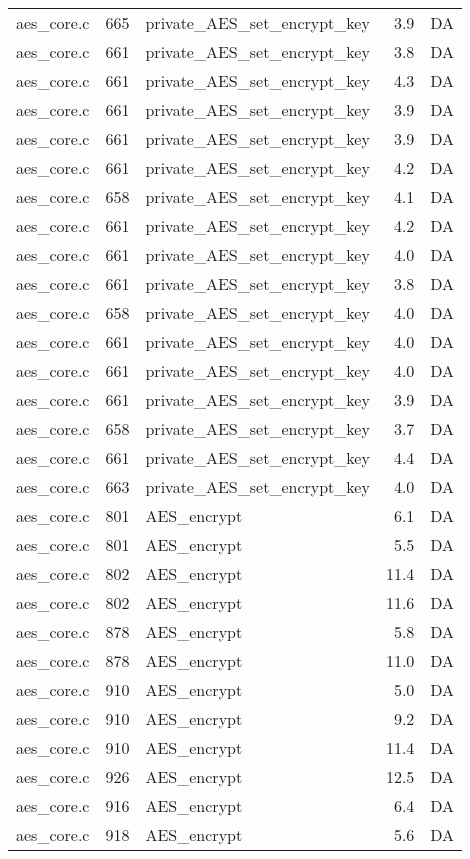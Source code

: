 \begin{table}[!ht]
\begin{tabular}{lrlrr}
aes\_core.c& 665&private\_AES\_set\_encrypt\_key&3.9 &DA\\
aes\_core.c& 661&private\_AES\_set\_encrypt\_key&3.8 &DA\\
aes\_core.c& 661&private\_AES\_set\_encrypt\_key&4.3 &DA\\
aes\_core.c& 661&private\_AES\_set\_encrypt\_key&3.9 &DA\\
aes\_core.c& 661&private\_AES\_set\_encrypt\_key&3.9 &DA\\
aes\_core.c& 661&private\_AES\_set\_encrypt\_key&4.2 &DA\\
aes\_core.c& 658&private\_AES\_set\_encrypt\_key&4.1 &DA\\
aes\_core.c& 661&private\_AES\_set\_encrypt\_key&4.2 &DA\\
aes\_core.c& 661&private\_AES\_set\_encrypt\_key&4.0 &DA\\
aes\_core.c& 661&private\_AES\_set\_encrypt\_key&3.8 &DA\\
aes\_core.c& 658&private\_AES\_set\_encrypt\_key&4.0 &DA\\
aes\_core.c& 661&private\_AES\_set\_encrypt\_key&4.0 &DA\\
aes\_core.c& 661&private\_AES\_set\_encrypt\_key&4.0 &DA\\
aes\_core.c& 661&private\_AES\_set\_encrypt\_key&3.9 &DA\\
aes\_core.c& 658&private\_AES\_set\_encrypt\_key&3.7 &DA\\
aes\_core.c& 661&private\_AES\_set\_encrypt\_key&4.4 &DA\\
aes\_core.c& 663&private\_AES\_set\_encrypt\_key&4.0 &DA\\
aes\_core.c& 801&AES\_encrypt&6.1 &DA\\
aes\_core.c& 801&AES\_encrypt&5.5 &DA\\
aes\_core.c& 802&AES\_encrypt&11.4 &DA\\
aes\_core.c& 802&AES\_encrypt&11.6 &DA\\
aes\_core.c& 878&AES\_encrypt&5.8 &DA\\
aes\_core.c& 878&AES\_encrypt&11.0 &DA\\
aes\_core.c& 910&AES\_encrypt&5.0 &DA\\
aes\_core.c& 910&AES\_encrypt&9.2 &DA\\
aes\_core.c& 910&AES\_encrypt&11.4 &DA\\
aes\_core.c& 926&AES\_encrypt&12.5 &DA\\
aes\_core.c& 916&AES\_encrypt&6.4 &DA\\
aes\_core.c& 918&AES\_encrypt&5.6 &DA\\

\end{tabular}
\end{table}
